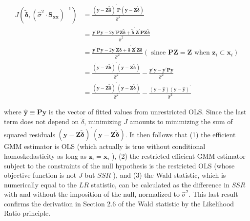 \documentclass[10pt]{article}
\begin{document}
\begin{align*}
J\left(\tilde{\boldsymbol{\delta}},\left(\hat{\sigma}^{2} \cdot \mathbf{S}_{\mathbf{x} \mathbf{x}}\right)^{-1}\right) & =\frac{(\mathbf{y}-\mathbf{Z} \tilde{\boldsymbol{\delta}})^{\prime} \mathbf{P}(\mathbf{y}-\mathbf{Z} \tilde{\boldsymbol{\delta}})}{\hat{\sigma}^{2}} \\
& =\frac{\mathbf{y}^{\prime} \mathbf{P} \mathbf{y}-2 \mathbf{y}^{\prime} \mathbf{P} \mathbf{Z} \tilde{\boldsymbol{\delta}}+\tilde{\boldsymbol{\delta}}^{\prime} \mathbf{Z}^{\prime} \mathbf{P} \mathbf{Z} \tilde{\boldsymbol{\delta}}}{\hat{\sigma}^{2}} \\
& =\frac{\mathbf{y}^{\prime} \mathbf{P} \mathbf{y}-2 \mathbf{y}^{\prime} \mathbf{Z} \tilde{\boldsymbol{\delta}}+\tilde{\boldsymbol{\delta}}^{\prime} \mathbf{Z}^{\prime} \mathbf{Z} \tilde{\boldsymbol{\delta}}}{\hat{\sigma}^{2}}\left(\text { since } \mathbf{P} \mathbf{Z}=\mathbf{Z} \text { when } \mathbf{z}_{i} \subset \mathbf{x}_{i}\right) \\
& =\frac{(\mathbf{y}-\mathbf{Z} \tilde{\boldsymbol{\delta}})^{\prime}(\mathbf{y}-\mathbf{Z} \tilde{\boldsymbol{\delta}})}{\hat{\sigma}^{2}}-\frac{\mathbf{y}^{\prime} \mathbf{y}-\mathbf{y}^{\prime} \mathbf{P} \mathbf{y}}{\hat{\sigma}^{2}} \\
& =\frac{(\mathbf{y}-\mathbf{Z} \tilde{\boldsymbol{\delta}})^{\prime}(\mathbf{y}-\mathbf{Z} \tilde{\boldsymbol{\delta}})}{\hat{\sigma}^{2}}-\frac{(\mathbf{y}-\hat{\mathbf{y}})(\mathbf{y}-\hat{\mathbf{y}})^{\prime}}{\hat{\sigma}^{2}} \tag{3.8.14}
\end{align*}


where $\hat{\mathbf{y}} \equiv \mathbf{P y}$ is the vector of fitted values from unrestricted OLS. Since the last term does not depend on $\tilde{\delta}$, minimizing $J$ amounts to minimizing the sum of squared residuals $(\mathbf{y}-\mathbf{Z} \tilde{\boldsymbol{\delta}})^{\prime}(\mathbf{y}-\mathbf{Z} \tilde{\boldsymbol{\delta}})$. It then follows that (1) the efficient GMM estimator is OLS (which actually is true without conditional homoskedasticity as long as $\mathbf{z}_{i}=\mathbf{x}_{i}$ ), (2) the restricted efficient GMM estimator subject to the constraints of the null hypothesis is the restricted OLS (whose objective function is not $J$ but $S S R$ ), and (3) the Wald statistic, which is numerically equal to the $L R$ statistic, can be calculated as the difference in $S S R$ with and without the imposition of the null, normalized to $\hat{\sigma}^{2}$. This last result confirms the derivation in Section 2.6 of the Wald statistic by the Likelihood Ratio principle.
\end{document}
